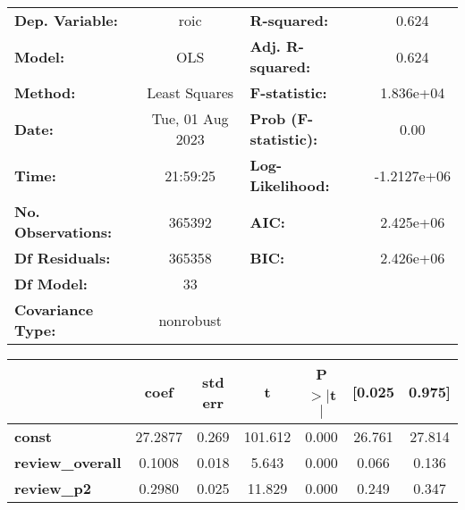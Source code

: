 \begin{center}
\begin{tabular}{lclc}
\toprule
\textbf{Dep. Variable:}                                               &       roic       & \textbf{  R-squared:         } &      0.624   \\
\textbf{Model:}                                                       &       OLS        & \textbf{  Adj. R-squared:    } &      0.624   \\
\textbf{Method:}                                                      &  Least Squares   & \textbf{  F-statistic:       } &  1.836e+04   \\
\textbf{Date:}                                                        & Tue, 01 Aug 2023 & \textbf{  Prob (F-statistic):} &      0.00    \\
\textbf{Time:}                                                        &     21:59:25     & \textbf{  Log-Likelihood:    } & -1.2127e+06  \\
\textbf{No. Observations:}                                            &      365392      & \textbf{  AIC:               } &  2.425e+06   \\
\textbf{Df Residuals:}                                                &      365358      & \textbf{  BIC:               } &  2.426e+06   \\
\textbf{Df Model:}                                                    &          33      & \textbf{                     } &              \\
\textbf{Covariance Type:}                                             &    nonrobust     & \textbf{                     } &              \\
\bottomrule
\end{tabular}
\begin{tabular}{lcccccc}
                                                                      & \textbf{coef} & \textbf{std err} & \textbf{t} & \textbf{P$> |$t$|$} & \textbf{[0.025} & \textbf{0.975]}  \\
\midrule
\textbf{const}                                                        &      27.2877  &        0.269     &   101.612  &         0.000        &       26.761    &       27.814     \\
\textbf{review\_overall}                                              &       0.1008  &        0.018     &     5.643  &         0.000        &        0.066    &        0.136     \\
\textbf{review\_p2}                                                   &       0.2980  &        0.025     &    11.829  &         0.000        &        0.249    &        0.347     \\

\end{tabular}
\end{center}
